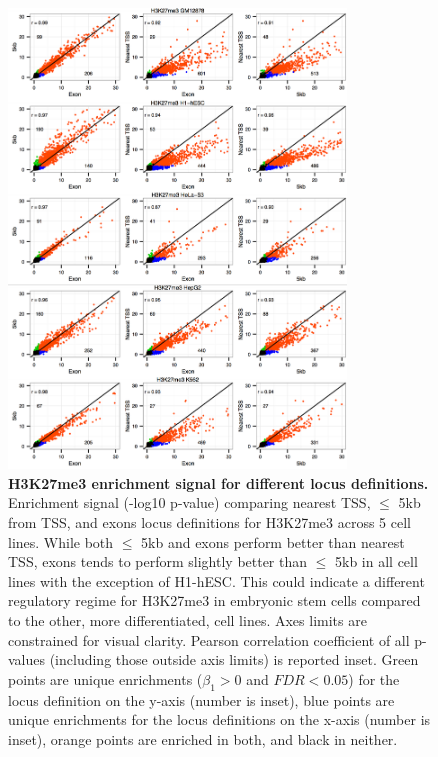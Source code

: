 \newpage

\begin{figure}[ht!]
\centering
\includegraphics[width=0.8\textwidth]{chap2figs/figure2_9.pdf}
\caption[H3K27me3 enrichment signal for different locus definitions.]
{
\textbf{H3K27me3 enrichment signal for different locus definitions.} Enrichment signal (-log10 p-value) comparing nearest TSS, $\leq$ 5kb from TSS, and exons locus definitions for H3K27me3 across 5 cell lines. While both $\leq$ 5kb and exons perform better than nearest TSS, exons tends to perform slightly better than $\leq$ 5kb in all cell lines with the exception of H1-hESC. This could indicate a different regulatory regime for H3K27me3 in embryonic stem cells compared to the other, more differentiated, cell lines. Axes limits are constrained for visual clarity. Pearson correlation coefficient of all p-values (including those outside axis limits) is reported inset. Green points are unique enrichments ($\beta_1 > 0$ and $FDR < 0.05$) for the locus definition on the y-axis (number is inset), blue points are unique enrichments for the locus definitions on the x-axis (number is inset), orange points are enriched in both, and black in neither.
}
\label{chap2:fig:9}
\end{figure}

